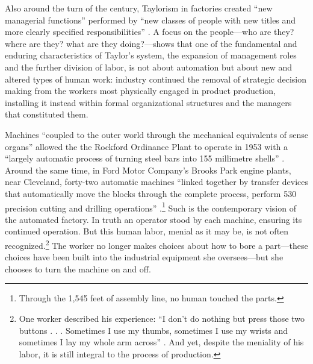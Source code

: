 
Also around the turn of the century, Taylorism in factories created ``new managerial
functions'' performed by ``new classes of people with new titles and
more clearly specified responsibilities'' \cite[p. 120]{aitken}. A focus on the
people---who are they? where are they? what are they doing?---shows that
one of the fundamental and enduring characteristics of Taylor's
system, the expansion of management roles and the further division of
labor, is not about automation but about new and altered
types of human work: industry continued
the removal of strategic decision making from the
workers most physically engaged in product production, installing it
instead within formal organizational structures and the managers that
constituted them. 



Machines ``coupled to the
outer world through the mechanical equivalents of sense organs''
allowed the the Rockford
Ordinance Plant to operate in 1953 with a ``largely automatic process of
turning steel bars into 155 millimetre
shells'' \cite{wienerMachineThreat}. Around the same time, in Ford
Motor Company's Brooks Park engine plants, near Cleveland, forty-two
automatic machines ``linked together by transfer devices that
automatically move the blocks through the complete process, perform
530 precision cutting and drilling operations'' \cite[p.
  9]{dieboldImpact}.\footnote{Through the 1,545 feet of assembly line, no human
touched the parts.} Such is the contemporary vision of the automated factory. In
truth an operator stood by each machine, ensuring its continued
operation. But this human labor, menial as it may be, is not often
recognized.\footnote{One worker described his experience: ``I don't do nothing but
press those two buttons . . . Sometimes I use my thumbs, sometimes I
use my wrists and sometimes I lay my whole arm across'' \cite[p.
  10]{dieboldImpact}. And yet,
despite the meniality of his labor, it is still integral to the
process of production.} The worker
no longer makes choices about how to bore a part---these choices have
been built into the industrial equipment 
she oversees---but she chooses to turn the machine on and off.%

